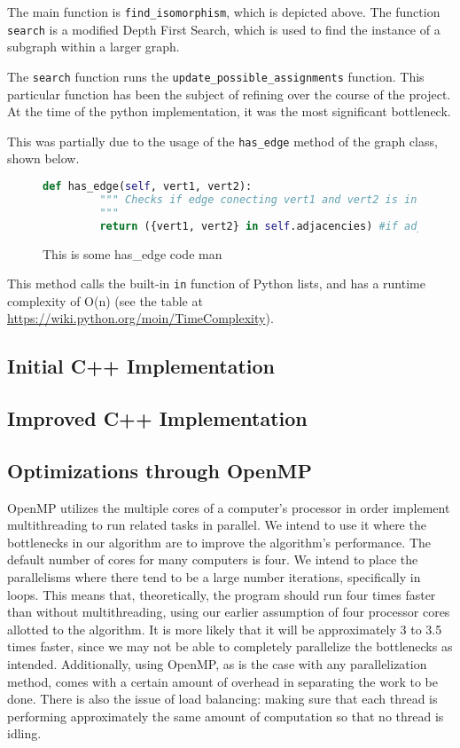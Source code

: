 \documentclass{article}
\begin{document}
  The main function is \texttt{find\_isomorphism}, which is depicted above. The function \texttt{search} is a modified Depth First Search, which is used to find the instance of a subgraph within a larger graph.


  The \texttt{search} function runs  the \texttt{update\_possible\_assignments} function. This particular function has been the subject of refining over the course of the project. At the time of the python implementation, it was the most significant bottleneck.


  This was partially due to the usage of the \texttt{has\_edge} method of the graph class, shown below.


  \begin{figure}[H]
    \centering

    \begin{lstlisting}[language=Python]
    def has_edge(self, vert1, vert2):
         """ Checks if edge conecting vert1 and vert2 is in the graph
         """
         return ({vert1, vert2} in self.adjacencies) #if adjacent, there's an edge

    \end{lstlisting}
    \caption{This is some has_edge code man}
  \end{figure}

  This method calls the built-in \texttt{in} function of Python lists, and has a runtime complexity of O(n) (see the table at \url{https://wiki.python.org/moin/TimeComplexity}).


  \subsection{Initial C++ Implementation}

  \subsection{Improved C++ Implementation}

  \subsection{Optimizations through OpenMP}
  OpenMP utilizes the multiple cores of a computer's processor in order implement multithreading to run related tasks in parallel. We intend to use it where the bottlenecks in our algorithm are to improve the algorithm's performance. The default number of cores for many computers is four. We intend to place the parallelisms where there tend to be a large number iterations, specifically in loops. This means that, theoretically, the program should run four times faster than without multithreading, using our earlier assumption of four processor cores allotted to the algorithm. It is more likely that it will be approximately 3 to 3.5 times faster, since we may not be able to completely parallelize the bottlenecks as intended. Additionally, using OpenMP, as is the case with any parallelization method, comes with a certain amount of overhead in separating the work to be done. There is also the issue of load balancing: making sure that each thread is performing approximately the same amount of computation so that no thread is idling. 
  
\end{document}
